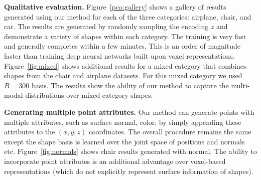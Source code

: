 
\vspace{12pt}
\noindent \textbf{Qualitative evaluation.} Figure~\ref{pca:gallery} shows a gallery of results generated using our method for each of the three categories: airplane, chair, and car. The results are generated by randomly sampling the encoding $z$ and demonstrate a variety of shapes within each category. The training is very fast and generally completes within a few minutes. This is an order of magnitude faster than training deep neural networks built upon voxel representations. Figure~\ref{fig:mixed} shows additional results for a mixed category that combines shapes from the chair and airplane datasets. For this mixed category we used $B=300$ basis. The results show the ability of our method to capture the multi-modal distributions over mixed-category shapes.

\vspace{12pt}
\noindent \textbf{Generating multiple point attributes.} Our method can generate points with multiple attributes, such as surface normal, color, by simply appending these attributes to the $(x,y,z)$ coordinates. The overall procedure remains the same except the shape basis is learned over the joint space of positions and normals etc. Figure~\ref{fig:normals} shows chair results generated with normal. The ability to incorporate point attributes is an additional advantage over voxel-based representations (which do not explicitly represent surface information of shapes).


